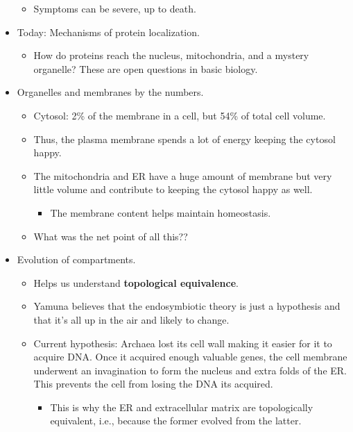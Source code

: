 \documentclass[../notes.tex]{subfiles}
\begin{document}
\begin{itemize}
    \begin{itemize}
        \item Symptoms can be severe, up to death.
    \end{itemize}
    \item Today: Mechanisms of protein localization.
    \begin{itemize}
        \item How do proteins reach the nucleus, mitochondria, and a mystery organelle? These are open questions in basic biology.
    \end{itemize}
    \item Organelles and membranes by the numbers.
    \begin{itemize}
        \item Cytosol: 2\% of the membrane in a cell, but 54\% of total cell volume.
        \item Thus, the plasma membrane spends a lot of energy keeping the cytosol happy.
        \item The mitochondria and ER have a huge amount of membrane but very little volume and contribute to keeping the cytosol happy as well.
        \begin{itemize}
            \item The membrane content helps maintain homeostasis.
        \end{itemize}
        \item What was the net point of all this??
    \end{itemize}
    \item Evolution of compartments.
    \begin{itemize}
        \item Helps us understand \textbf{topological equivalence}.
        \item Yamuna believes that the endosymbiotic theory is just a hypothesis and that it's all up in the air and likely to change.
        \item Current hypothesis: Archaea lost its cell wall making it easier for it to acquire DNA. Once it acquired enough valuable genes, the cell membrane underwent an invagination to form the nucleus and extra folds of the ER. This prevents the cell from losing the DNA its acquired.
        \begin{itemize}
            \item This is why the ER and extracellular matrix are topologically equivalent, i.e., because the former evolved from the latter.
        \end{itemize}

\end{itemize}
\end{itemize}
\end{document}
